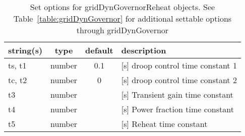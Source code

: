 \begin{table}[ht]
\centering
\begin{tabular}{p{5cm} c c p{7cm}}
\hline
string(s) & type & default & description \\
\hline
ts, t1 & number & 0.1 & [s]   droop control time constant 1\\
tc, t2 & number & 0 & [s]   droop control  time constant 2\\
t3 & number &  & [s]    Transient gain time constant\\
t4 & number &  & [s]    Power fraction time constant\\
t5 & number &  & [s]    Reheat time constant\\
\hline
\end{tabular}
\caption{Set options for gridDynGovernorReheat objects. See Table~\ref{table:gridDynGovernor} for additional settable options through gridDynGovernor}
\label{table:gridDynGovernorReheat}
\end{table}
